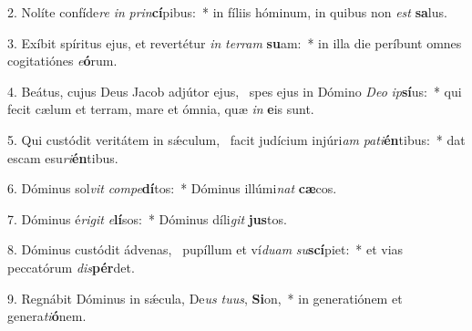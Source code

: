 2. Nolíte confíde\textit{re} \textit{in} \textit{prin}\textbf{cí}pibus:~*  in fíliis hóminum, in quibus non \textit{est} \textbf{sa}lus.\

3. Exíbit spíritus ejus, et revertétur \textit{in} \textit{ter}\textit{ram} \textbf{su}am:~*  in illa die períbunt omnes cogitatiónes \textit{e}\textbf{ó}rum.\

4. Beátus, cujus Deus Jacob adjútor ejus, \dag\  spes ejus in Dómino \textit{De}\textit{o} \textit{ip}\textbf{sí}us:~*  qui fecit cælum et terram, mare et ómnia, quæ \textit{in} \textbf{e}is sunt.\

5. Qui custódit veritátem in sǽculum, \dag\  facit judícium injúri\textit{am} \textit{pa}\textit{ti}\textbf{én}tibus:~*  dat escam esu\textit{ri}\textbf{én}tibus.\

6. Dóminus sol\textit{vit} \textit{com}\textit{pe}\textbf{dí}tos:~*  Dóminus illúmi\textit{nat} \textbf{cæ}cos.\

7. Dóminus é\textit{ri}\textit{git} \textit{e}\textbf{lí}sos:~*  Dóminus díli\textit{git} \textbf{jus}tos.\

8. Dóminus custódit ádvenas, \dag\  pupíllum et ví\textit{du}\textit{am} \textit{su}\textbf{scí}piet:~*  et vias peccatórum \textit{dis}\textbf{pér}det.\

9. Regnábit Dóminus in sǽcula, De\textit{us} \textit{tu}\textit{us}, \textbf{Si}on,~*  in generatiónem et genera\textit{ti}\textbf{ó}nem.\

